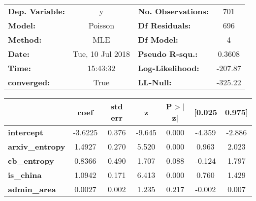 \documentclass{report}
\begin{document}
\begin{center}
\begin{tabular}{lclc}
\toprule
\textbf{Dep. Variable:} &        y         & \textbf{  No. Observations:  } &      701    \\
\textbf{Model:}         &     Poisson      & \textbf{  Df Residuals:      } &      696    \\
\textbf{Method:}        &       MLE        & \textbf{  Df Model:          } &        4    \\
\textbf{Date:}          & Tue, 10 Jul 2018 & \textbf{  Pseudo R-squ.:     } &   0.3608    \\
\textbf{Time:}          &     15:43:32     & \textbf{  Log-Likelihood:    } &   -207.87   \\
\textbf{converged:}     &       True       & \textbf{  LL-Null:           } &   -325.22   \\
\bottomrule
\end{tabular}
\begin{tabular}{lcccccc}
                        & \textbf{coef} & \textbf{std err} & \textbf{z} & \textbf{P$>$$|$z$|$} & \textbf{[0.025} & \textbf{0.975]}  \\
\midrule
\textbf{intercept}      &      -3.6225  &        0.376     &    -9.645  &         0.000        &       -4.359    &       -2.886     \\
\textbf{arxiv\_entropy} &       1.4927  &        0.270     &     5.520  &         0.000        &        0.963    &        2.023     \\
\textbf{cb\_entropy}    &       0.8366  &        0.490     &     1.707  &         0.088        &       -0.124    &        1.797     \\
\textbf{is\_china}      &       1.0942  &        0.171     &     6.413  &         0.000        &        0.760    &        1.429     \\
\textbf{admin\_area}    &       0.0027  &        0.002     &     1.235  &         0.217        &       -0.002    &        0.007     \\
\bottomrule
\end{tabular}
\end{center}
\end{document}
